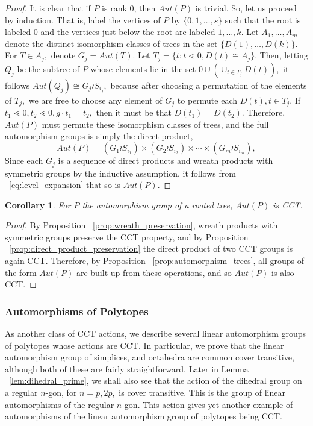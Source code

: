 \documentclass[10 pt]{amsart}
\theoremstyle{plain}
\newtheorem{cor}[thm]{Corollary}
\theoremstyle{definition}
\theoremstyle{remark}
\numberwithin{equation}{section}
\newcommand\sssec{\subsubsection}
\begin{document}
\begin{proof}
It is clear that if $P$ is rank 0, then $Aut(P)$ is trivial. So, let us proceed by induction. That is, label the vertices of $P$ by $\{0,1,\ldots, s\}$ such that the root is labeled $0$ and the vertices just below the root are labeled $1, \ldots, k.$ Let $A_1,\ldots, A_m$ denote the distinct isomorphism classes of trees in the set $\{D(1),\ldots, D(k)\}.$ For $T \in A_j,$ denote $G_j = Aut(T).$ 
Let $T_j = \{t:t\lessdot 0,D(t) \cong A_j\}.$ Then, letting $Q_j$ be the subtree of $P$ whose elements lie in the set $0 \cup (\cup_{t \in T_j} D(t)),$ it follows $Aut(Q_j) \cong G_j \wr S_{i_j},$ because after choosing a permutation of the elements of $T_j,$ we are free to choose any element of $G_j$ to permute each $D(t),t \in T_j$. If $t_1 \lessdot 0,t_2 \lessdot 0,g \cdot t_1 = t_2,$ then it must be that $D(t_1) = D(t_2).$ Therefore, $Aut(P)$ must permute these isomorphism classes of trees, and the full automorphism groups is simply the direct product, 
\begin{equation}
\label{eq:level_expansion}
Aut(P) = (G_1 \wr S_{i_1}) \times (G_2 \wr S_{i_2}) \times \cdots \times (G_m\wr S_{i_m}),
\end{equation}
Since each $G_j$ is a sequence of direct products and wreath products with symmetric groups by the inductive assumption, it follows from ~\eqref{eq:level_expansion} that so is $Aut(P).$
\end{proof}

\begin{cor}
For $P$ the automorphism group of a rooted tree, $Aut(P)$ is CCT.
\end{cor}
\begin{proof}
By Proposition ~\ref{prop:wreath_preservation}, wreath products with symmetric groups preserve the CCT property, and by Proposition ~\ref{prop:direct_product_preservation} the direct product of two CCT groups is again CCT. Therefore, by Proposition ~\ref{prop:automorphism_trees}, all groups of the form $Aut(P)$ are built up from these operations, and so $Aut(P)$ is also CCT.
\end{proof}

\sssec{Automorphisms of Polytopes}
As another class of CCT actions, we describe several linear automorphism groups of polytopes whose actions are CCT. In particular, we prove that the linear automorphism group of simplices, and octahedra are common cover transitive, although both of these are fairly straightforward.
Later in Lemma ~\ref{lem:dihedral_prime}, we shall also see that the action of the dihedral group on a regular $n$-gon, for $n = p,2p,$ is cover transitive. This is the group of linear automorphisms of the regular $n$-gon. This action gives yet another example of automorphisms of the linear automorphism group of polytopes being CCT.
\end{document}
